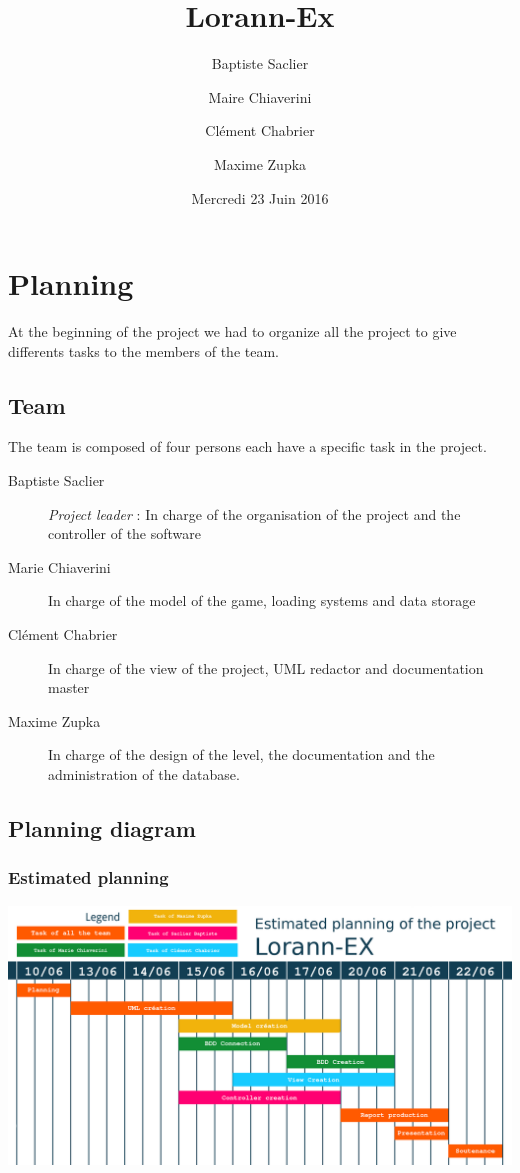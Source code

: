\documentclass{report}
\title{Lorann-Ex}
\author{Baptiste Saclier\and Maire Chiaverini\and Clément Chabrier\and Maxime Zupka}
\date{Mercredi 23 Juin 2016}
\begin{document}
\maketitle

\tableofcontents
\clearpage

\chapter{Planning}

At the beginning of the project we had to organize all the project to give differents tasks to the members of the team.

\section{Team}

The team is composed of four persons each have a specific task in the project.

\begin{description}
\item[Baptiste Saclier] \emph{Project leader} : In charge of the organisation of the project and the controller of the software
\item[Marie Chiaverini] In charge of the model of the game, loading systems and data storage
\item[Clément Chabrier] In charge of the view of the project, UML redactor and documentation master
\item[Maxime Zupka] In charge of the design of the level, the documentation and the administration of the database.
\end{description}

\section{Planning diagram}


\begin{landscape}
\subsection{Estimated planning}
\vspace*{\fill}

\begin{center}
\includegraphics{resources/Planning-previsionnel.png}
\end{center}

\vspace*{\fill}

\end{landscape}
\end{document}
